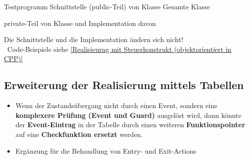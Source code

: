 \begin{minipage}[t]{0.48\columnwidth}
    \raggedright
    
    \vspace{0.1cm}

    \begin{outline}
        \1 Testprogramm 
        \1 Schnittstelle (public-Teil) von Klasse 
        \1 Gesamte Klasse 
    \end{outline}
\end{minipage}
\hfill
\begin{minipage}[t]{0.48\columnwidth}
    \raggedright
    
    \vspace{0.1cm}

    \begin{outline}
        \1 private-Teil von Klasse  und Implementation davon
    \end{outline}
\end{minipage}




Die Schnittstelle  und die Implementation  ändern sich nicht! \\
\textrightarrow\ Code-Beispiele siehe \ref{Realisieurng mit Steuerkonstrukt (objektorientiert in CPP)}


 




\subsection{Erweiterung der Realisierung mittels Tabellen}

\begin{itemize}
    \item Wenn der Zustandsübergang nicht durch einen Event, sondern eine \textbf{komplexere Prüfung (Event und Guard)} ausgelöst wird, 
        dann könnte der \textbf{Event-Eintrag} in der Tabelle durch einen weiteren \textbf{Funktionspointer} auf eine 
        \textbf{Checkfunktion ersetzt} werden.
    \item Ergänzung für die Behandlung von Entry- und Exit-Actions
\end{itemize}


